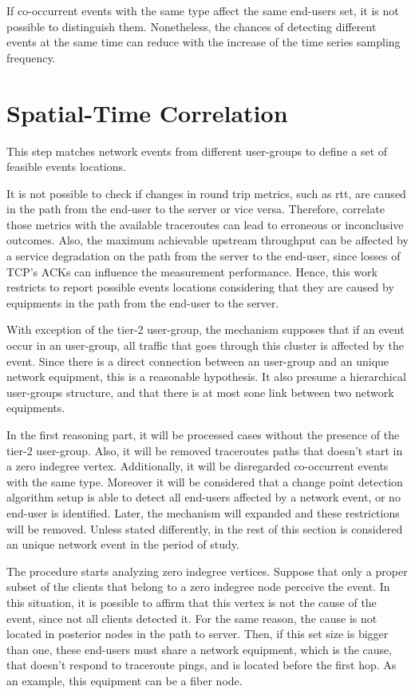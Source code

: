 If co-occurrent events with the same type affect the same end-users set,
it is not possible to distinguish them. Nonetheless, the chances of
detecting different events at the same time can reduce with the increase
of the time series sampling frequency.

\section{Spatial-Time Correlation}
\label{sec:spatial_time_correlation}

This step matches network events from different user-groups to define
a set of feasible events locations.

It is not possible to check if changes in round trip metrics, such as \gls*{rtt},
are caused in the path from the end-user to the server or vice versa.
Therefore, correlate those metrics with the available traceroutes can lead to
erroneous or inconclusive outcomes. Also, the maximum achievable upstream
throughput can be affected by a service degradation on the path from the server
to the end-user, since losses of TCP's ACKs can influence the measurement
performance.
Hence, this work restricts to report possible events locations considering that
they are caused by equipments in the path from the end-user to the server.

With exception of the tier-2 user-group, the mechanism supposes that
if an event occur in an user-group,
all traffic that goes through this cluster is affected by the event. Since
there is a direct connection between an user-group and an unique network
equipment, this is a reasonable hypothesis.
It also presume a hierarchical user-groups structure, and that there is at most
sone link between two network equipments.

In the first reasoning part, it will be processed cases without the
presence of the tier-2 user-group.
Also, it will be removed
traceroutes paths that doesn't start in a zero indegree vertex.
Additionally, it will be disregarded co-occurrent events with the same type.
Moreover it will be considered that
a change point detection algorithm setup is able to detect all end-users
affected by a network event, or no end-user is identified.
Later, the mechanism will expanded and these restrictions will be removed.
Unless stated differently, in the rest of this section is considered an
unique network event in the period of study.

The procedure starts analyzing zero indegree vertices.
Suppose that only a proper subset of the clients that belong to a zero
indegree node perceive the event. In this situation, it is possible to affirm
that this vertex is not the cause of the event, since not all clients detected
it. For the same reason, the cause is not located in posterior nodes
in the path to server.
Then, if this set size is bigger than one, these end-users must share
a network equipment, which is the cause, that doesn't respond to traceroute
pings, and is located before the first hop. As an example,
this equipment can be a fiber node.

